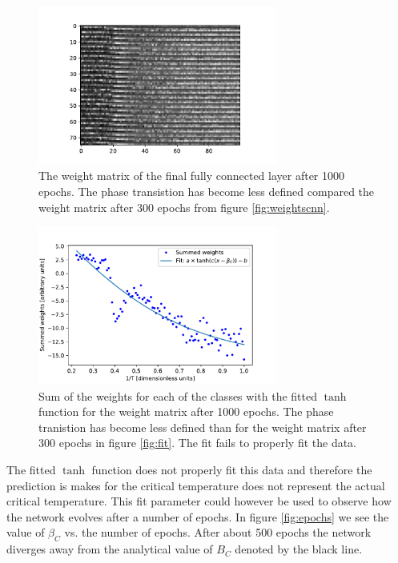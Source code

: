 \documentclass[10 pt, a4paper]{article}
\begin{document}
\begin{figure}[H]
\centering
\includegraphics[width=0.7\textwidth]{weightswrong}
\caption{The weight matrix of the final fully connected layer after 1000 epochs. The phase transistion has become less defined compared the weight matrix after 300 epochs from figure \ref{fig:weightscnn}. \label{fig:weightswrong}}
\end{figure}

\begin{figure}[H]
\centering
\includegraphics[width=0.7\textwidth]{fitwrong}
\caption{Sum of the weights for each of the classes with the fitted $\tanh$ function for the weight matrix after 1000 epochs. The phase tranistion has become less defined than for the weight matrix after 300 epochs in figure \ref{fig:fit}. The fit fails to properly fit the data. \label{fig:fitwrong}}
\end{figure}

The fitted $\tanh$ function does not properly fit this data and therefore the prediction is makes for the critical temperature does not represent the actual critical temperature. This fit parameter could however be used to observe how the network evolves after a number of epochs. In figure \ref{fig:epochs} we see the value of $\beta_C$ vs. the number of epochs. After about 500 epochs the network diverges away from the analytical value of $B_C$ denoted by the black line.
\end{document}
